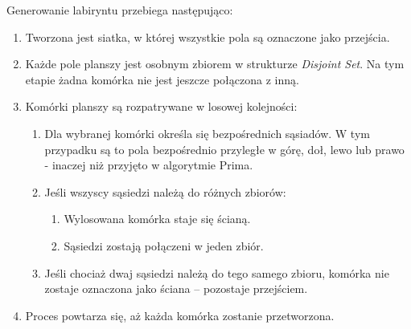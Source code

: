 Generowanie labiryntu przebiega następująco:
\begin{enumerate}
    \item Tworzona jest siatka, w której wszystkie pola są oznaczone jako przejścia.

    

    \item Każde pole planszy jest osobnym zbiorem w strukturze \textit{Disjoint Set}. Na tym etapie żadna komórka nie jest jeszcze połączona z inną.

    

    \item Komórki planszy są rozpatrywane w losowej kolejności:
    \begin{enumerate}
        \item Dla wybranej komórki określa się bezpośrednich sąsiadów. W tym przypadku są to pola bezpośrednio przyległe w górę, doł, lewo lub prawo - inaczej niż przyjęto w algorytmie Prima.
        
        

        \item Jeśli wszyscy sąsiedzi należą do różnych zbiorów:
        \begin{enumerate}
            \item Wylosowana komórka staje się ścianą.
            \item Sąsiedzi zostają połączeni w jeden zbiór.
        \end{enumerate}

        

        \item Jeśli chociaż dwaj sąsiedzi należą do tego samego zbioru, komórka nie zostaje oznaczona jako ściana – pozostaje przejściem.

        
    \end{enumerate}

    \item Proces powtarza się, aż każda komórka zostanie przetworzona.
    
    

    
\end{enumerate}

\clearpage
